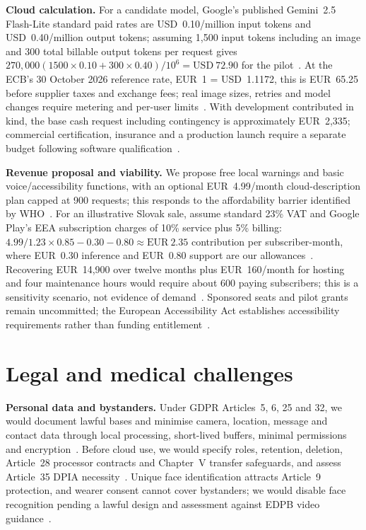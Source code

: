 \documentclass[10pt,twoside,english,a4paper]{article}
\begin{document}
\textbf{Cloud calculation.} For a candidate model, Google's published Gemini~2.5 Flash-Lite standard paid rates are USD~0.10/million input tokens and USD~0.40/million output tokens; assuming 1,500 input tokens including an image and 300 total billable output tokens per request gives $270{,}000(1500\times0.10+300\times0.40)/10^6=\mathrm{USD}~72.90$ for the pilot~\cite{geminipricing2026}. At the ECB's 30 October 2026 reference rate, EUR~1 = USD~1.1172, this is EUR~65.25 before supplier taxes and exchange fees; real image sizes, retries and model changes require metering and per-user limits~\cite{ecbrate20261030,geminipricing2026}. With development contributed in kind, the base cash request including contingency is approximately EUR~2,335; commercial certification, insurance and a production launch require a separate budget following software qualification~\cite{eurolabour2025,mdcg2019software}.

\textbf{Revenue proposal and viability.} We propose free local warnings and basic voice/accessibility functions, with an optional EUR~4.99/month cloud-description plan capped at 900 requests; this responds to the affordability barrier identified by WHO~\cite{whotechnology2024}. For an illustrative Slovak sale, assume standard 23\% VAT and Google Play's EEA subscription charges of 10\% service plus 5\% billing: $4.99/1.23\times0.85-0.30-0.80\approx\mathrm{EUR}~2.35$ contribution per subscriber-month, where EUR~0.30 inference and EUR~0.80 support are our allowances~\cite{slovakvat2026,playfees2026,geminipricing2026}. Recovering EUR~14,900 over twelve months plus EUR~160/month for hosting and four maintenance hours would require about 600 paying subscribers; this is a sensitivity scenario, not evidence of demand~\cite{eurolabour2025,cloudrunpricing2026}. Sponsored seats and pilot grants remain uncommitted; the European Accessibility Act establishes accessibility requirements rather than funding entitlement~\cite{eaa}.

\clearpage
\section*{Legal and medical challenges}

\textbf{Personal data and bystanders.} Under GDPR Articles~5, 6, 25 and 32, we would document lawful bases and minimise camera, location, message and contact data through local processing, short-lived buffers, minimal permissions and encryption~\cite{gdpr}. Before cloud use, we would specify roles, retention, deletion, Article~28 processor contracts and Chapter~V transfer safeguards, and assess Article~35 DPIA necessity~\cite{gdpr}. Unique face identification attracts Article~9 protection, and wearer consent cannot cover bystanders; we would disable face recognition pending a lawful design and assessment against EDPB video guidance~\cite{gdpr,edpbvideo2020}.
\end{document}
